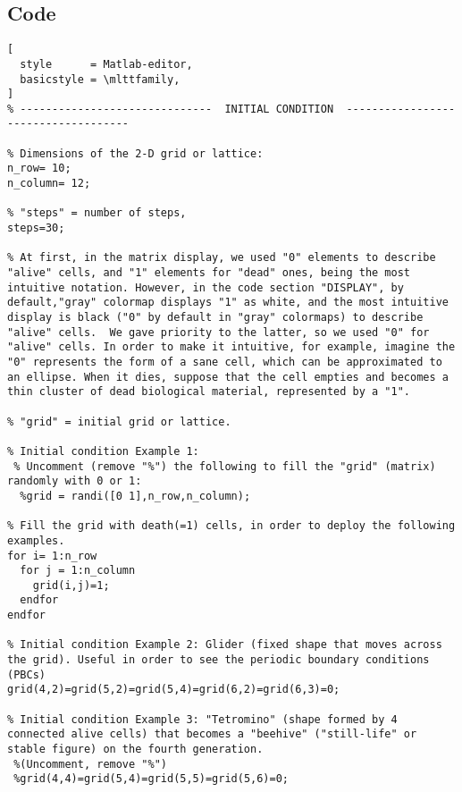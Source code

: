 \documentclass[11pt]{article}
\numberwithin{equation}{section} %
\numberwithin{figure}{section} %
\begin{document}
\begin{appendices}
\section{} 

\subsection{Code} \label{appendix_A_code}

\begin{lstlisting}[
  style      = Matlab-editor,
  basicstyle = \mlttfamily,
]
% ------------------------------  INITIAL CONDITION  ------------------------------------ 

% Dimensions of the 2-D grid or lattice:
n_row= 10;                     
n_column= 12;

% "steps" = number of steps,
steps=30;

% At first, in the matrix display, we used "0" elements to describe "alive" cells, and "1" elements for "dead" ones, being the most intuitive notation. However, in the code section "DISPLAY", by default,"gray" colormap displays "1" as white, and the most intuitive display is black ("0" by default in "gray" colormaps) to describe "alive" cells.  We gave priority to the latter, so we used "0" for "alive" cells. In order to make it intuitive, for example, imagine the "0" represents the form of a sane cell, which can be approximated to an ellipse. When it dies, suppose that the cell empties and becomes a thin cluster of dead biological material, represented by a "1".

% "grid" = initial grid or lattice.

% Initial condition Example 1: 
 % Uncomment (remove "%") the following to fill the "grid" (matrix) randomly with 0 or 1:
  %grid = randi([0 1],n_row,n_column);
  
% Fill the grid with death(=1) cells, in order to deploy the following examples.
for i= 1:n_row
  for j = 1:n_column
    grid(i,j)=1;
  endfor
endfor

% Initial condition Example 2: Glider (fixed shape that moves across the grid). Useful in order to see the periodic boundary conditions (PBCs)
grid(4,2)=grid(5,2)=grid(5,4)=grid(6,2)=grid(6,3)=0; 
 
% Initial condition Example 3: "Tetromino" (shape formed by 4 connected alive cells) that becomes a "beehive" ("still-life" or stable figure) on the fourth generation.
 %(Uncomment, remove "%")
 %grid(4,4)=grid(5,4)=grid(5,5)=grid(5,6)=0;


\end{lstlisting}
\end{appendices}
\end{document}
